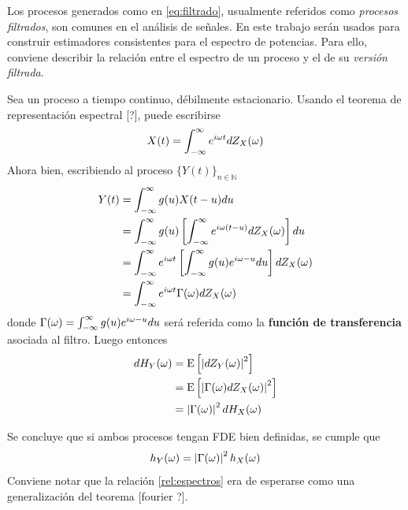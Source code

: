 Los procesos generados como en \ref{eq:filtrado}, usualmente referidos como \textit{procesos filtrados}, son comunes en el análisis de señales. 
%
En este trabajo serán usados para construir estimadores consistentes para el espectro de potencias.
%
Para ello, conviene describir la relación entre el espectro de un proceso y el de su \textit{versión filtrada}.

Sea \xt un proceso a tiempo continuo, débilmente estacionario. Usando el teorema de representación espectral [?], puede escribirse
\begin{equation}
X(t) = \int_{-\infty}^{\infty} e^{i \omega t }  dZ_X(\omega)
\end{equation}
Ahora bien, escribiendo al proceso $\{Y(t)\}_{n\in \mathbb{N}}$
\begin{align*}
Y(t) &= \int_{-\infty}^{\infty} g(u) X(t-u) du \\
&= \int_{-\infty}^{\infty} g(u) \left[ \int_{-\infty}^{\infty} e^{i \omega (t-u) }  dZ_X(\omega) \right] du \\
&= \int_{-\infty}^{\infty} e^{i \omega t } \left[ \int_{-\infty}^{\infty} g(u) e^{i \omega -u } du \right] dZ_X(\omega) \\
&= \int_{-\infty}^{\infty} e^{i \omega t } \Gamma(\omega) dZ_X(\omega)
\end{align*}
donde $\Gamma(\omega) = \int_{-\infty}^{\infty} g(u) e^{i \omega -u } du$ será referida como la \textbf{función de transferencia} asociada al filtro. 
%
Luego entonces
\begin{align*}
dH_Y(\omega) &= \mathrm{E}\left[ \left| dZ_Y(\omega) \right|^{2} \right]  \\
&= \mathrm{E}\left[ \left| \Gamma(\omega) dZ_X(\omega) \right|^{2} \right]  \\
&= \left| \Gamma(\omega) \right|^{2} dH_X(\omega)
\end{align*}

Se concluye que si ambos procesos tengan FDE bien definidas, se cumple que
\begin{equation}
h_Y(\omega) = \left| \Gamma(\omega) \right|^{2} h_X(\omega)
\label{rel:espectros}
\end{equation}
%
Conviene notar que la relación \ref{rel:espectros} era de esperarse como una generalización del teorema [fourier ?].


